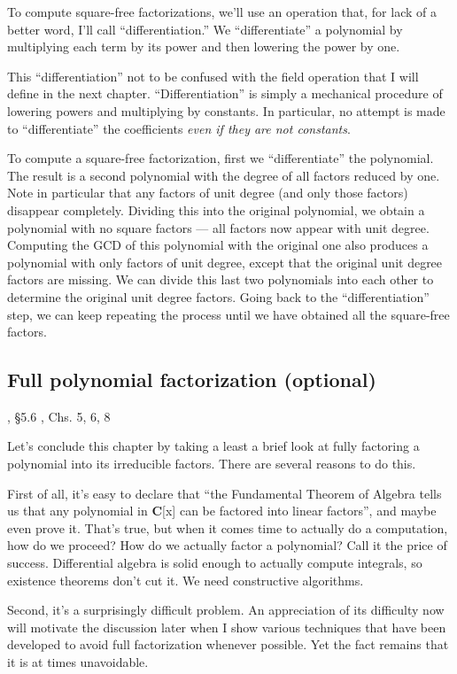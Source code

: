 To compute square-free factorizations, we'll use an operation that,
for lack of a better word, I'll call ``differentiation.''  We
``differentiate'' a polynomial by multiplying each term by its power
and then lowering the power by one.

This ``differentiation'' not to be confused with the field operation
that I will define in the next chapter.  ``Differentiation'' is simply
a mechanical procedure of lowering powers and multiplying by
constants.  In particular, no attempt is made to ``differentiate''
the coefficients {\it even if they are not constants}.

To compute a square-free factorization, first we ``differentiate'' the
polynomial.  The result is a second polynomial with the degree of all
factors reduced by one.  Note in particular that any factors of unit
degree (and only those factors) disappear completely.  Dividing this
into the original polynomial, we obtain a polynomial with no square
factors --- all factors now appear with unit degree.  Computing the
GCD of this polynomial with the original one also produces a
polynomial with only factors of unit degree, except that the original
unit degree factors are missing.  We can divide this last two
polynomials into each other to determine the original unit degree
factors.  Going back to the ``differentiation'' step, we can keep
repeating the process until we have obtained all the square-free
factors.


\subsection*{Full polynomial factorization (optional)}

, \S5.6
\hbox{}\qquad [Ge92], Chs. 5, 6, 8

Let's conclude this chapter by taking a least a brief look at fully
factoring a polynomial into its irreducible factors.  There are
several reasons to do this.

First of all, it's easy to declare that ``the Fundamental Theorem of
Algebra tells us that any polynomial in {\bf C}[x] can be factored
into linear factors'', and maybe even prove it.  That's true, but when it comes
time to actually do a computation, how do we proceed?  How do we
actually factor a polynomial?  Call it the price of success.
Differential algebra is solid enough to actually compute integrals, so
existence theorems don't cut it.  We need constructive algorithms.

Second, it's a surprisingly difficult problem.  An appreciation of its
difficulty now will motivate the discussion later when I show various
techniques that have been developed to avoid full factorization
whenever possible.  Yet the fact remains that it is at times
unavoidable.

